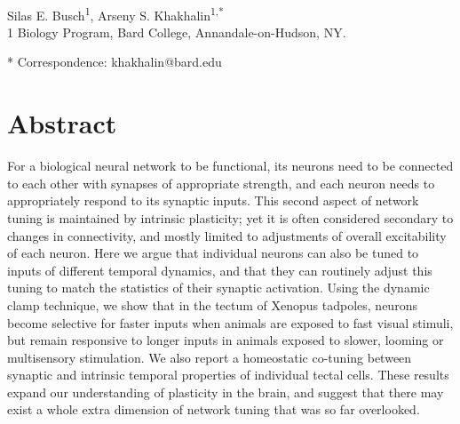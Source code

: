 \documentclass{article}
\begin{document}


\linenumbers %

\begin{flushleft}
{\Large
\textbf{}
}
\newline
\\
Silas E. Busch\textsuperscript{1},
Arseny S. Khakhalin\textsuperscript{1,*}
\\
\bigskip
{1} Biology Program, Bard College, Annandale-on-Hudson, NY. 

* Correspondence: khakhalin@bard.edu

\section*{Abstract}

For a biological neural network to be functional, its neurons need to be connected to each other with synapses of appropriate strength, and each neuron needs to appropriately respond to its synaptic inputs. This second aspect of network tuning is maintained by intrinsic plasticity; yet it is often considered secondary to changes in connectivity, and mostly limited to adjustments of overall excitability of each neuron. Here we argue that individual neurons can also be tuned to inputs of different temporal dynamics, and that they can routinely adjust this tuning to match the statistics of their synaptic activation. Using the dynamic clamp technique, we show that in the tectum of Xenopus tadpoles, neurons become selective for faster inputs when animals are exposed to fast visual stimuli, but remain responsive to longer inputs in animals exposed to slower, looming or multisensory stimulation. We also report a homeostatic co-tuning between synaptic and intrinsic temporal properties of individual tectal cells. These results expand our understanding of plasticity in the brain, and suggest that there may exist a whole extra dimension of network tuning that was so far overlooked.


\end{flushleft}
\end{document}
